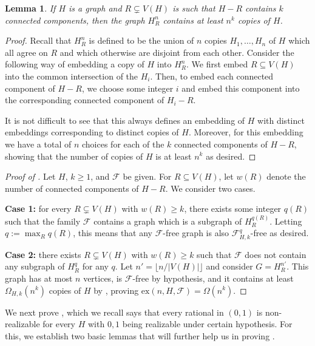 \documentclass[12pt,letterpaper]{article}
\newtheorem{lemma}[theorem]{Lemma}
\theoremstyle{definition}
\newcommand{\pow}{q} %
\newcommand{\ex}{\mathrm{ex}}
\renewcommand{\c}[1]{\mathcal{#1}}
\newcommand{\Om}{\Omega}
\newcommand{\sub}{\subseteq}
\begin{document}
	\begin{lemma}\label{lemma powers many copies}
		If $H$ is a graph and $R\subsetneq V(H)$ is such that $H-R$ contains $k$ connected components, then the graph $H_R^n$ contains at least $n^k$ copies of $H$.
	\end{lemma}
	\begin{proof}
		Recall that $H_R^n$ is defined to be the union of $n$ copies $H_1,\ldots,H_n$ of $H$ which all agree on $R$ and which otherwise are disjoint from each other.  Consider the following way of embedding a copy of $H$ into $H_R^n$.  We first embed $R\sub V(H)$ into the common intersection of the $H_i$.  Then, to embed each connected component of $H-R$, we choose some integer $i$ and embed this component into the corresponding connected component of $H_i - R$.  
		
		It is not difficult to see that this always defines an embedding of $H$ with distinct embeddings corresponding to distinct copies of $H$.  Moreover, for this embedding we have a total of $n$ choices for each of the $k$ connected components of $H-R$, showing that the number of copies of $H$ is at least $n^{k}$ as desired.
	\end{proof}
	
	
	
	\begin{proof}[Proof of ]
		Let $H$, $k \geq 1$, and $\c{F}$ be given. For $R \subseteq V(H)$, let $w(R)$ denote the number of connected components of $H - R$. %
		We consider two cases.
		
		\textbf{Case 1:} for every $R \subsetneq V(H)$ with $w(R) \geq k$, there exists some integer $\pow(R)$ such that the family $\c{F}$ contains a graph which is a subgraph of $H_R^{\pow(R)}$.  Letting $\pow:=\max_R \pow(R)$, this means that any $\c{F}$-free graph is also $\c{F}_{H,k}^\pow$-free as desired.
		
		\textbf{Case 2:} there exists $R \subsetneq V(H)$ with $w(R) \geq k$ such that $\c{F}$ does not contain any subgraph of $H_R^\pow$ for any $\pow$. Let $n' = \lfloor{n/|V(H)|}\rfloor$ and consider $G = H_R^{n'}$.  This graph has at most $n$ vertices, is $\c{F}$-free by hypothesis, and it contains at least $\Om_{H,k}(n^k)$ copies of $H$ by  , proving $\ex(n,H,\c{F}) = \Om(n^k)$. 
		
	\end{proof}
	
	We next prove , which we recall says that every rational in $(0,1)$ is non-realizable for every $H$ with $0,1$ being realizable under certain hypothesis.  For this, we establish two basic lemmas that will further help us in proving .
	
\end{document}
